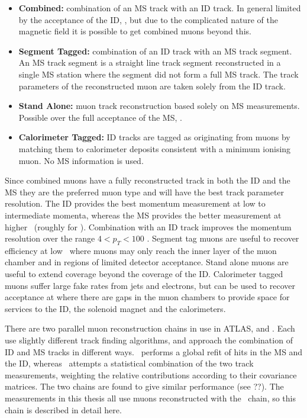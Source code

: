 \begin{itemize}

    \item {\bf Combined:} combination of an MS track with an ID track. In
    general limited by the acceptance of the ID, , but due to the complicated
    nature of the magnetic field it is possible to get combined muons beyond
    this.

    \item {\bf Segment Tagged:} combination of an ID track with an MS track
    segment. An MS track segment is a straight line track segment reconstructed
    in a single MS station where the segment did not form a full MS track. The
    track parameters of the reconstructed muon are taken solely from the ID
    track.

    \item {\bf Stand Alone:} muon track reconstruction based solely on 
    MS measurements. Possible over the full acceptance of the MS,
    .

    \item {\bf Calorimeter Tagged:} ID tracks are tagged as originating from
    muons by matching them to calorimeter deposits consistent with a minimum ionising
    muon. No MS information is used.


\end{itemize}

Since combined muons have a fully reconstructed track in both the ID and the MS
they are the preferred muon type and will have the best track parameter
resolution. The ID provides the best momentum measurement at low to intermediate
momenta, whereas the MS provides the better measurement at higher \pt\ (roughly
for ). Combination with an ID track improves the momentum resolution
over the range $4 < p_{T} < 100$ \GeV. Segment tag muons are useful to recover
efficiency at low \pt\ where muons may only reach the inner layer of the muon
chamber and in regions of limited detector acceptance. Stand alone muons are
useful to extend coverage beyond the coverage of the ID. Calorimeter tagged
muons suffer large fake rates from jets and electrons, but can be used to recover
acceptance at  where there are gaps in the muon chambers to
provide space for services to the ID, the solenoid magnet and the calorimeters.

There are two parallel muon reconstruction chains in use in ATLAS,
\staco\cite{1742-6596-219-3-032052} and
\muid. Each use slightly different track finding algorithms, and approach the
combination of ID and MS tracks in different ways. \muid\ performs a global
refit of hits in the MS and the ID, whereas \staco\ attempts a statistical
combination of the two track measurements, weighting the relative contributions
according to their covariance matrices. The two chains are found to give similar
performance (see ??). The measurements in this thesis all use muons
reconstructed with the \staco\ chain, so this chain is described in detail here.

